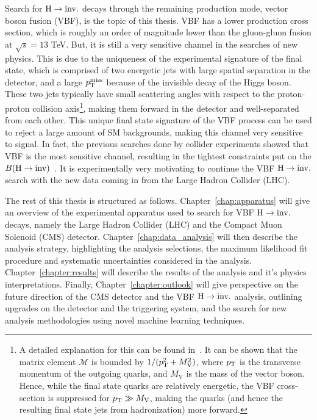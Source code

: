 Search for $\textrm{H} \rightarrow \textrm{inv.}$ decays through the remaining production mode, vector boson fusion (VBF), is the topic of this thesis.
VBF has a lower production cross section, which is roughly an order of magnitude lower than the gluon-gluon fusion at $\sqrt{s} = 13$ TeV. But, it is still
a very sensitive channel in the searches of new physics. This is due to the uniqueness of the experimental signature of the final state, which is comprised of two energetic jets with large
spatial separation in the detector, and a large $p_{\textrm{T}}^{\textrm{miss}}$ because of the invisible decay of the Higgs boson. These two jets typically have small scattering angles with respect to the proton-proton
collision axis\footnote{A detailed explanation for this can be found in~\cite{Djouadi:2005gi}. It can be shown that the matrix element $\mathcal{M}$ is bounded by $1 / (p_{\textrm{T}}^2 + M_{\mathrm{V}}^2)$,
where $p_{\textrm{T}}$ is the transverse momentum of the outgoing quarks, and $M_{\mathrm{V}}$ is the mass of the vector boson. Hence, while the final state quarks are relatively energetic, the VBF cross-section is
suppressed for $p_{\textrm{T}} \gg M_{\mathrm{V}}$, making the quarks (and hence the resulting final state jets from hadronization) more forward.}, 
making them forward in the detector and well-separated from each other. This unique final state signature of the VBF process can be used to reject a large amount of
SM backgrounds, making this channel very sensitive to signal. In fact, the previous searches done by collider experiments showed that VBF is the most sensitive channel, resulting
in the tightest constraints put on the ${B(\textrm{H}\rightarrow\text{inv})}$~\cite{CMS:2018yfx}. It is experimentally very motivating to continue the VBF $\textrm{H} \rightarrow \textrm{inv.}$ search with the new data coming in from
the Large Hadron Collider (LHC).

The rest of this thesis is structured as follows. Chapter~\ref{chap:apparatus} will give an overview of the experimental apparatus used to search for VBF $\textrm{H} \rightarrow \textrm{inv.}$ decays, namely the Large
Hadron Collider (LHC) and the Compact Muon Solenoid (CMS) detector. Chapter~\ref{chap:data_analysis} will then describe the analysis strategy, highlighting the analysis selections, the maximum
likelihood fit procedure and systematic uncertainties considered in the analysis. Chapter~\ref{chapter:results} will describe the results of the analysis and it's physics interpretations. Finally,
Chapter~\ref{chapter:outlook} will give perspective on the future direction of the CMS detector and the VBF $\textrm{H} \rightarrow \textrm{inv.}$ analysis, outlining upgrades on the detector and the triggering system, and
the search for new analysis methodologies using novel machine learning techniques.